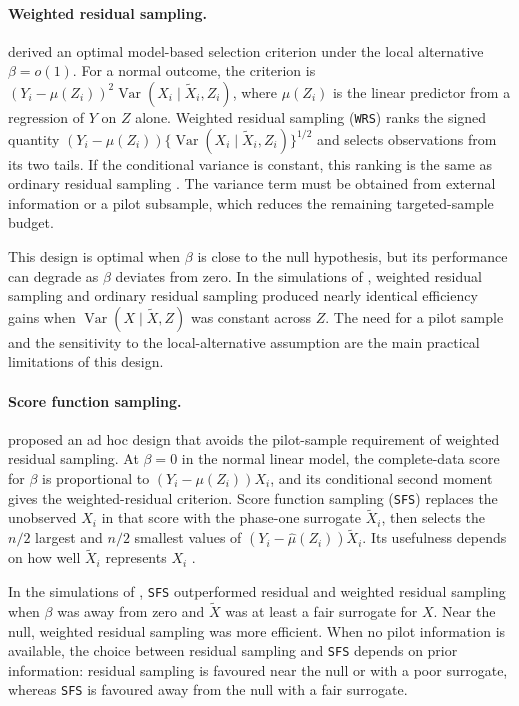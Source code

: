 \paragraph{Weighted residual sampling.}
\citet{tao2019optimal} derived an optimal model-based selection criterion under the local alternative $\beta = o(1)$. For a normal outcome, the criterion is $(Y_i - \mu(Z_i))^2 \operatorname{Var}(X_i \mid \tilde{X}_i, Z_i)$, where $\mu(Z_i)$ is the linear predictor from a regression of $Y$ on $Z$ alone. Weighted residual sampling (\texttt{WRS}) ranks the signed quantity $(Y_i-\mu(Z_i))\{\operatorname{Var}(X_i\mid\tilde{X}_i,Z_i)\}^{1/2}$ and selects observations from its two tails. If the conditional variance is constant, this ranking is the same as ordinary residual sampling \citep{amorim2021two}. The variance term must be obtained from external information or a pilot subsample, which reduces the remaining targeted-sample budget.

This design is optimal when $\beta$ is close to the null hypothesis, but its performance can degrade as $\beta$ deviates from zero. In the simulations of \citet{amorim2021two}, weighted residual sampling and ordinary residual sampling produced nearly identical efficiency gains when $\operatorname{Var}(X\mid\tilde{X},Z)$ was constant across $Z$. The need for a pilot sample and the sensitivity to the local-alternative assumption are the main practical limitations of this design.

\paragraph{Score function sampling.}
\citet{amorim2021two} proposed an ad hoc design that avoids the pilot-sample requirement of weighted residual sampling. At $\beta=0$ in the normal linear model, the complete-data score for $\beta$ is proportional to $(Y_i - \mu(Z_i)) X_i$, and its conditional second moment gives the weighted-residual criterion. Score function sampling (\texttt{SFS}) replaces the unobserved $X_i$ in that score with the phase-one surrogate $\tilde{X}_i$, then selects the $n/2$ largest and $n/2$ smallest values of $(Y_i - \hat{\mu}(Z_i)) \tilde{X}_i$. Its usefulness depends on how well $\tilde{X}_i$ represents $X_i$ \citep{amorim2021two}.

In the simulations of \citet{amorim2021two}, \texttt{SFS} outperformed residual and weighted residual sampling when $\beta$ was away from zero and $\tilde{X}$ was at least a fair surrogate for $X$. Near the null, weighted residual sampling was more efficient. When no pilot information is available, the choice between residual sampling and \texttt{SFS} depends on prior information: residual sampling is favoured near the null or with a poor surrogate, whereas \texttt{SFS} is favoured away from the null with a fair surrogate.

